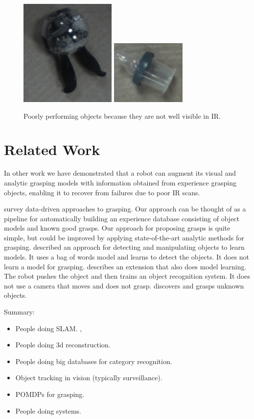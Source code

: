 \documentclass[graybox]{svmult}
\begin{document}
\begin{figure}
\includegraphics[width=0.3\linewidth]{figures/saltshaker.png}
\includegraphics[width=0.3\linewidth]{figures/bottletop.png}
\caption{Poorly performing objects because they are not well visible
  in IR.\label{fig:poor_ir}}
\end{figure}

\section{Related Work}

\label{sec:relatedwork}

In other work we have demonstrated that a robot can augment its visual
and analytic grasping models with information obtained from experience
grasping objects, enabling it to recover from failures due to poor IR
scans.

\citet{bohg13} survey data-driven approaches to grasping.  Our
approach can be thought of as a pipeline for automatically building an
experience database consisting of object models and known good grasps.
Our approach for proposing grasps is quite simple, but could be
improved by applying state-of-the-art analytic methods for grasping.
\citet{ude12} described an approach for detecting and manipulating
objects to learn models.  It uses a bag of words model and learns to
detect the objects.  It does not learn a model for grasping.
\citet{schiebener13} describes an extension that also does model
learning.  The robot pushes the object and then trains an object
recognition system.  It does not use a camera that moves and does not
grasp.  \citet{schiebener12} discovers and grasps unknown objects.

Summary: 
\begin{itemize}
\item People doing SLAM.  \citet{wang07, gallagher09}, 
\item People doing 3d reconstruction.   \citet{krainin11, banta00}
\item People doing big databases for category recognition.  \citet{kent14a, kent14, lai11a, goldfeder09}
\item Object tracking in vision (typically surveillance).
\item POMDPs for grasping.  \citet{platt11, hsiao10}
\item People doing systems.  \citet{hudson12, ciocarlie14}
\end{itemize}
\end{document}
